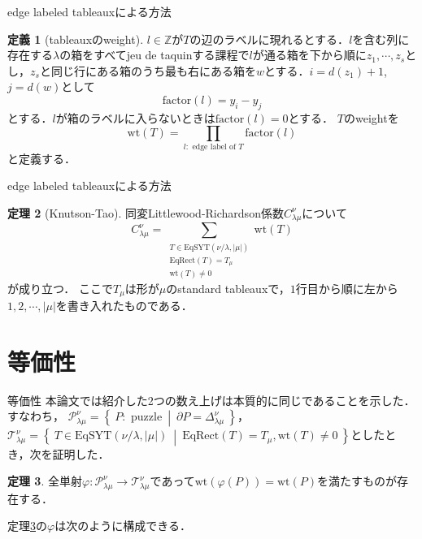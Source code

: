 \documentclass[unicode,12pt]{beamer}%
\theoremstyle{definition}
\newtheorem{defin}{定義}[section]
\newtheorem{theo}[defin]{定理}
\theoremstyle{example}
\newcommand{\integer}{\mathbb{Z}}
\newcommand{\set}[2]{\left\{\:#1\:\middle|\:#2\:\right\}}
\begin{document}
\begin{frame}{edge labeled tableauxによる方法}
  \begin{defin}[tableauxのweight]
    \small
    $l\in\integer$が$T$の辺のラベルに現れるとする．$l$を含む列に存在する$\lambda$の箱をすべてjeu de taquinする課程で$l$が通る箱を下から順に$z_{1},\cdots,z_{s}$とし，$z_{s}$と同じ行にある箱のうち最も右にある箱を$w$とする．$i = d(z_1) + 1$, $j = d(w)$として
    \[
    \text{factor}(l) = y_i - y_j
    \]
    とする．$l$が箱のラベルに入らないときは$\text{factor}(l) = 0$とする．
    $T$のweightを
    \[
    \text{wt}(T) = \prod_{l:\text{ edge label of }T} \text{factor}(l)
    \]
    と定義する．
  \end{defin}
  \normalsize
\end{frame}

\begin{frame}{edge labeled tableauxによる方法}
  \begin{theo}[Knutson-Tao]
    同変Littlewood-Richardson係数$C^\nu_{\lambda\mu}$について
    \[
    C^\nu_{\lambda\mu} = \sum_{\substack{
      T\in\text{EqSYT}(\nu/\lambda,|\mu|)\\
      \text{EqRect}(T) = T_\mu\\
      \text{wt}(T)\neq 0
    }}\text{wt}(T)
    \]
    が成り立つ．
    ここで$T_\mu$は形が$\mu$のstandard tableauxで，$1$行目から順に左から$1,2,\cdots,|\mu|$を書き入れたものである．
  \end{theo}
\end{frame}


\section[]{等価性}

\begin{frame}{等価性}
  本論文では紹介した2つの数え上げは本質的に同じであることを示した．すなわち，
  $\mathcal{P}^\nu_{\lambda\mu}=\set{P:\text{ puzzle}}{\partial P = \Delta^\nu_{\lambda\mu}}$，$\mathcal{T}^\nu_{\lambda\mu} = \set{T\in\text{EqSYT}(\nu/\lambda,|\mu|)}{\text{EqRect}(T)=T_\mu,\text{wt}(T)\neq 0}$としたとき，次を証明した．
  \begin{theo}\label{main theorem}
    全単射$\varphi:\mathcal{P}^\nu_{\lambda\mu}\rightarrow \mathcal{T}^\nu_{\lambda\mu}$であって$\text{wt}(\varphi(P))=\text{wt}(P)$を満たすものが存在する．
  \end{theo}
  定理\ref{main theorem}の$\varphi$は次のように構成できる．
\end{frame}
\end{document}
